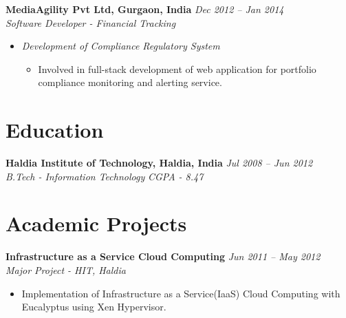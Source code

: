 \documentclass[margin,line]{resume}
\begin{document}
\begin{resume}
    \textbf{MediaAgility Pvt Ltd, Gurgaon, India}   \hfill \textsl{Dec 2012 -- Jan 2014} \vspace{0mm}\\\vspace{0mm}%
           \textsl{Software Developer - Financial Tracking}\\
    \begin{itemize}
    
     \item \textsl{Development of Compliance Regulatory System} 
        \begin{itemize}
            \item Involved in full-stack development of web application for portfolio compliance monitoring and alerting service.
        \end{itemize}
    
    \end{itemize}
        
    \section{\mysidestyle Education}

    \textbf{Haldia Institute of Technology, Haldia, India} \hfill \textsl{Jul 2008 -- Jun 2012}\vspace{0mm}\\\vspace{0mm}%
    \textsl{B.Tech - Information Technology} \textsl{CGPA - 8.47} \hfill



    \section{\mysidestyle Academic Projects}
    \textbf{Infrastructure as a Service Cloud Computing} \hfill \textsl{Jun 2011 -- May 2012}\vspace{0mm}\\\vspace{0mm}%
    \textsl{Major Project - HIT, Haldia} 
       \begin{itemize} 
	        \item Implementation of Infrastructure as a Service(IaaS) Cloud Computing with Eucalyptus using Xen Hypervisor.
       \end{itemize}


\end{resume}
\end{document}
